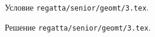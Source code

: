 Условие \texttt{regatta/senior/geomt/3.tex}.

\solution Решение \texttt{regatta/senior/geomt/3.tex}.
